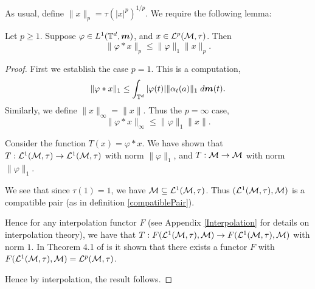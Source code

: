 As usual, define $\|x\|_p = \tau(|x|^p)^{1/p}$. We require the following lemma:
\begin{lemma}
    Let $p \geq 1$. Suppose $\varphi \in L^1(\mathbb{T}^d,\boldsymbol{m})$, and $x \in \mathcal{L}^p(\mathcal{M},\tau)$. Then
    \begin{equation}
        \|\varphi*x\|_p \leq \|\varphi\|_1\|x\|_p.
    \end{equation}
\end{lemma} 
\begin{proof}
    First we establish the case $p  =  1$. This is a computation,
    \begin{equation}
        \|\varphi * x\|_1 \leq \int_{\mathbb{T}^d} |\varphi(t)|\|\alpha_{t}(a)\|_1\;d\boldsymbol{m}(t).
    \end{equation}
    Similarly, we define $\|x\|_\infty = \|x\|$. Thus the $p = \infty$ case,
    \begin{equation}
        \|\varphi*x\|_\infty \leq \|\varphi\|_1\|x\|.
    \end{equation}
    
    Consider the function $T(x) = \varphi * x$. We
    have shown that $T:\mathcal{L}^1(\mathcal{M},\tau)\to\mathcal{L}^1(\mathcal{M},\tau)$
    with norm $\|\varphi\|_1$, and $T:\mathcal{M}\to \mathcal{M}$ with norm $\|\varphi\|_1$.
    
    We see that since $\tau(1) = 1$, we have $\mathcal{M} \subseteq \mathcal{L}^1(\mathcal{M},\tau)$.
    Thus $(\mathcal{L}^1(\mathcal{M},\tau),\mathcal{M})$ is a compatible pair (as in definition \ref{compatiblePair}).
    
    Hence for any interpolation functor $F$ (see Appendix \ref{Interpolation}
    for details on interpolation theory),
    we have that $T:F(\mathcal{L}^1(\mathcal{M},\tau),\mathcal{M})\to F(\mathcal{L}^1(\mathcal{M},\tau),\mathcal{M})$
    with norm $1$. In Theorem 4.1 of \cite{DDP92} is it shown that there exists
    a functor $F$ with $F(\mathcal{L}^1(\mathcal{M},\tau),\mathcal{M}) = \mathcal{L}^p(\mathcal{M},\tau)$.
    
    Hence by interpolation, the result follows.
\end{proof} 


